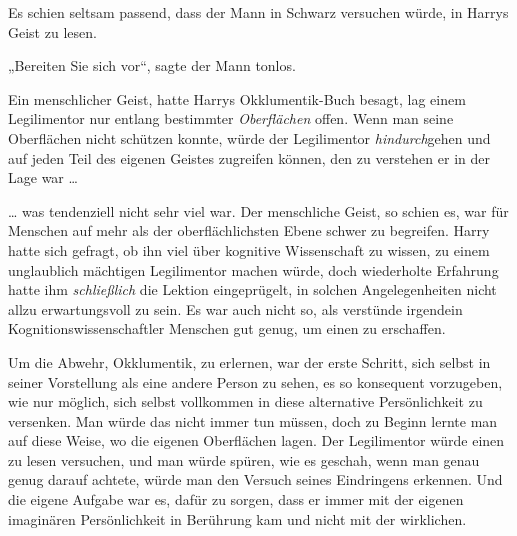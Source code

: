 Es schien seltsam passend, dass der Mann in Schwarz versuchen würde, in Harrys Geist zu lesen.

„Bereiten Sie sich vor“, sagte der Mann tonlos.

Ein menschlicher Geist, hatte Harrys Okklumentik-Buch besagt, lag einem Legilimentor nur entlang bestimmter \emph{Oberflächen} offen. Wenn man seine Oberflächen nicht schützen konnte, würde der Legilimentor \emph{hindurch}gehen und auf jeden Teil des eigenen Geistes zugreifen können, den zu verstehen er in der Lage war …

… was tendenziell nicht sehr viel war. Der menschliche Geist, so schien es, war für Menschen auf mehr als der oberflächlichsten Ebene schwer zu begreifen. Harry hatte sich gefragt, ob ihn viel über kognitive Wissenschaft zu wissen, zu einem unglaublich mächtigen Legilimentor machen würde, doch wiederholte Erfahrung hatte ihm \emph{schließlich} die Lektion eingeprügelt, in solchen Angelegenheiten nicht allzu erwartungsvoll zu sein. Es war auch nicht so, als verstünde irgendein Kognitionswissenschaftler Menschen gut genug, um einen zu erschaffen.

Um die Abwehr, Okklumentik, zu erlernen, war der erste Schritt, sich selbst in seiner Vorstellung als eine andere Person zu sehen, es so konsequent vorzugeben, wie nur möglich, sich selbst vollkommen in diese alternative Persönlichkeit zu versenken. Man würde das nicht immer tun müssen, doch zu Beginn lernte man auf diese Weise, wo die eigenen Oberflächen lagen. Der Legilimentor würde einen zu lesen versuchen, und man würde spüren, wie es geschah, wenn man genau genug darauf achtete, würde man den Versuch seines Eindringens erkennen. Und die eigene Aufgabe war es, dafür zu sorgen, dass er immer mit der eigenen imaginären Persönlichkeit in Berührung kam und nicht mit der wirklichen.

